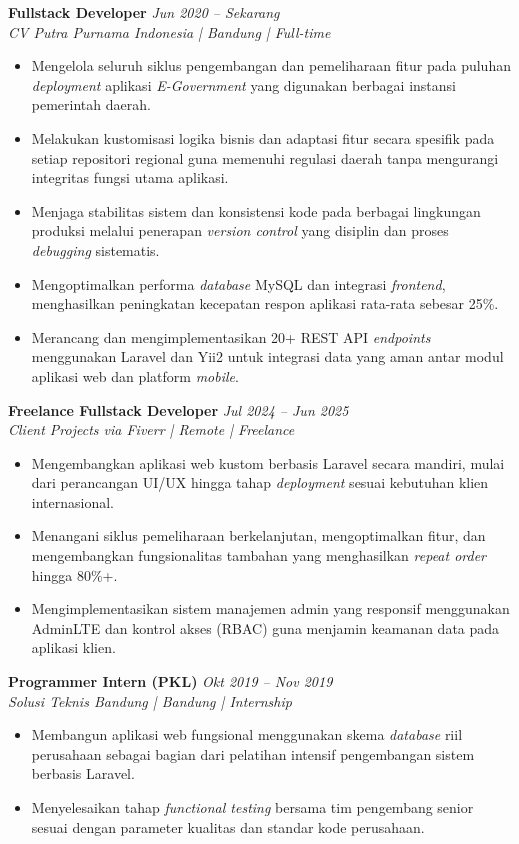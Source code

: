\documentclass[11pt,a4paper]{article}
\begin{document}
\textbf{Fullstack Developer} \hfill \textit{Jun 2020 -- Sekarang} \\
\textit{CV Putra Purnama Indonesia | Bandung | Full-time}
\begin{itemize}
    \item Mengelola seluruh siklus pengembangan dan pemeliharaan fitur pada puluhan \textit{deployment} aplikasi \textit{E-Government} yang digunakan berbagai instansi pemerintah daerah.
    \item Melakukan kustomisasi logika bisnis dan adaptasi fitur secara spesifik pada setiap repositori regional guna memenuhi regulasi daerah tanpa mengurangi integritas fungsi utama aplikasi.
    \item Menjaga stabilitas sistem dan konsistensi kode pada berbagai lingkungan produksi melalui penerapan \textit{version control} yang disiplin dan proses \textit{debugging} sistematis.
    \item Mengoptimalkan performa \textit{database} MySQL dan integrasi \textit{frontend}, menghasilkan peningkatan kecepatan respon aplikasi rata-rata sebesar 25\%.
    \item Merancang dan mengimplementasikan 20+ REST API \textit{endpoints} menggunakan Laravel dan Yii2 untuk integrasi data yang aman antar modul aplikasi web dan platform \textit{mobile}.
\end{itemize}

\textbf{Freelance Fullstack Developer} \hfill \textit{Jul 2024 -- Jun 2025} \\
\textit{Client Projects via Fiverr | Remote | Freelance}
\begin{itemize}
    \item Mengembangkan aplikasi web kustom berbasis Laravel secara mandiri, mulai dari perancangan UI/UX hingga tahap \textit{deployment} sesuai kebutuhan klien internasional.
    \item Menangani siklus pemeliharaan berkelanjutan, mengoptimalkan fitur, dan mengembangkan fungsionalitas tambahan yang menghasilkan \textit{repeat order} hingga 80\%+.
    \item Mengimplementasikan sistem manajemen admin yang responsif menggunakan AdminLTE dan kontrol akses (RBAC) guna menjamin keamanan data pada aplikasi klien.
\end{itemize}

\textbf{Programmer Intern (PKL)} \hfill \textit{Okt 2019 -- Nov 2019} \\
\textit{Solusi Teknis Bandung | Bandung | Internship}
\begin{itemize}
    \item Membangun aplikasi web fungsional menggunakan skema \textit{database} riil perusahaan sebagai bagian dari pelatihan intensif pengembangan sistem berbasis Laravel.
    \item Menyelesaikan tahap \textit{functional testing} bersama tim pengembang senior sesuai dengan parameter kualitas dan standar kode perusahaan.
\end{itemize}
\end{document}
